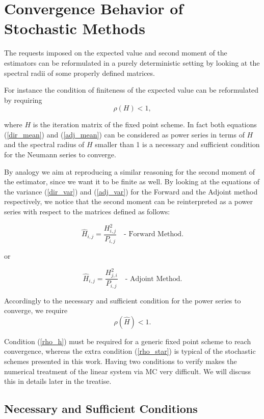 \section{Convergence Behavior of Stochastic Methods}

The requests imposed on the expected value and second moment of the estimators
can be reformulated in a purely deterministic setting by looking at the
spectral radii of some properly defined matrices.

For instance the condition of finiteness of the expected value can be
reformulated by requiring
\begin{equation}
 \rho(H)<1
 \label{rho_h},
\end{equation}

where $H$ is the iteration matrix of the fixed point scheme.
In fact both equations (\ref{dir_mean}) and (\ref{adj_mean}) can be considered
as
power series in terms of $H$ and the spectral radius of $H$ smaller
than 1 is a necessary and sufficient condition for the Neumann series to
converge.


By analogy we aim at reproducing a similar reasoning for the second moment of
the estimator, since we want it to be finite as well.
By looking at the equations of the variance (\ref{dir_var}) and (\ref{adj_var})
for
the Forward and the Adjoint method respectively, we notice that the second
moment can be reinterpreted as a power series with respect to the matrices
defined as follows:

\[
 \hat{H}_{i,j}=\frac{H_{i,j}^2}{P_{i,j}} \quad \text{- Forward Method}.
\]

or

\[
 \hat{H}_{i,j}=\frac{H_{j,i}^2}{P_{i,j}} \quad \text{- Adjoint Method}.
\]


Accordingly to the necessary and sufficient condition for the power series to
converge, we require
\begin{equation}
 \rho(\hat{H})<1.
 \label{rho_star}
\end{equation}

Condition (\ref{rho_h}) must be required for a generic fixed point scheme to
reach convergence, whereas the extra condition (\ref{rho_star}) is typical of
the stochastic schemes presented in this work. Having two conditions to
verify makes the numerical treatment of the linear system via MC very
difficult. We will discuss this in details later in the treatise. \newline

\subsection{Necessary and Sufficient Conditions}

